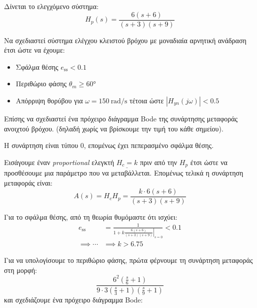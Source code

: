 \documentclass[11pt,a4paper,notitlepage,fleqn,final]{article}
\begin{document}
\begin{exercise}
Δίνεται το ελεγχόμενο σύστημα:
\[
H_p(s) = \frac{6(s+6)}{(s+3)(s+9)}
\]

Να σχεδιαστεί σύστημα ελέγχου κλειστού βρόχου με μοναδιαία αρνητική ανάδραση έτσι ώστε
να έχουμε:
\begin{itemize}
	\item Σφάλμα θέσης \( e_{\mathrm{ss}} < 0.1 \)
	\item Περιθώριο φάσης \( \theta_m \geq \ang{60} \)
	\item Απόρριψη θορύβου για \( \omega = \SI{150}{\radian/\second} \) τέτοια ώστε
	\( \left|H_{yn}(j\omega )\right| < 0.5 \)
\end{itemize}

Επίσης να σχεδιαστεί ένα πρόχειρο διάγραμμα Bode της συνάρτησης μεταφοράς ανοιχτού βρόχου.
(δηλαδή χωρίς να βρίσκουμε την τιμή του κάθε σημείου).

\tcblower
Η συνάρτηση είναι τύπου 0, επομένως έχει πεπερασμένο σφάλμα θέσης.

Εισάγουμε έναν \textit{proportional} ελεγκτή \( \underline{H_c = k} \) πριν από
την \( H_p \) έτσι ώστε να προσθέσουμε μια παράμετρο που να μεταβάλλεται. Επομένως τελικά
η συνάρτηση μεταφοράς είναι:
\[
A(s) = H_cH_p = \frac{k\cdot 6(s+6)}{(s+3)(s+9)}
\]

Για το σφάλμα θέσης, από τη θεωρία θυμόμαστε ότι ισχύει:
\begin{align*}
	e_{\mathrm{ss}} &= \frac{1}{1+\left.k\frac{6(s+6)}{(s+3)(s+9)}\right|_{s=0}} < 0.1
	\\ \implies \cdots &\implies k > 6.75
\end{align*}

Για να υπολογίσουμε το περιθώριο φάσης, πρώτα φέρνουμε τη συνάρτηση μεταφοράς στη μορφή:
\[
\frac{6^2\left( \frac{s}{6} + 1 \right)}{9\cdot 3 \left( \frac{s}{3}+1 \right)\left(
	\frac{s}{9}+1
	\right)}
\]
και σχεδιάζουμε ένα πρόχειρο διάγραμμα Bode:

\end{exercise}
\end{document}
